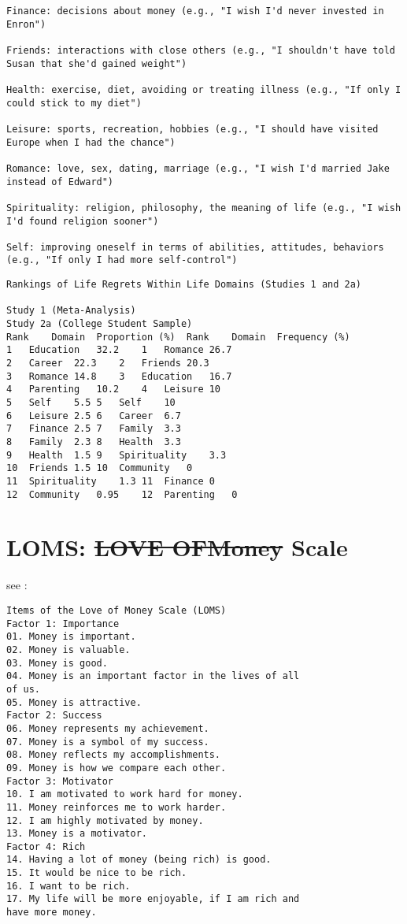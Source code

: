 \documentclass[10pt, letterpaper]{article}
\providecommand{\DIFaddtex}[1]{{\protect\color{blue}\uwave{#1}}} %
\providecommand{\DIFdeltex}[1]{{\protect\color{red}\sout{#1}}}                      %
\providecommand{\DIFaddbegin}{} %
\providecommand{\DIFaddend}{} %
\providecommand{\DIFdelbegin}{} %
\providecommand{\DIFdelend}{} %
\providecommand{\DIFadd}[1]{\texorpdfstring{\DIFaddtex{#1}}{#1}} %
\providecommand{\DIFdel}[1]{\texorpdfstring{\DIFdeltex{#1}}{}} %
\newcommand{\DIFscaledelfig}{0.5}
\newlength{\DIFdelgraphicswidth} %
\newlength{\DIFdelgraphicsheight} %
\newcommand{\DIFaddincludegraphics}[2][]{{\color{blue}\fbox{\DIFOincludegraphics[#1]{#2}}}} %
\newcommand{\DIFdelincludegraphics}[2][]{%
\sbox{\DIFdelgraphicsbox}{\DIFOincludegraphics[#1]{#2}}%
\settoboxwidth{\DIFdelgraphicswidth}{\DIFdelgraphicsbox} %
\settoboxtotalheight{\DIFdelgraphicsheight}{\DIFdelgraphicsbox} %
\scalebox{\DIFscaledelfig}{%
\parbox[b]{\DIFdelgraphicswidth}{\usebox{\DIFdelgraphicsbox}\\[-\baselineskip] \rule{\DIFdelgraphicswidth}{0em}}\llap{\resizebox{\DIFdelgraphicswidth}{\DIFdelgraphicsheight}{%
\setlength{\unitlength}{\DIFdelgraphicswidth}%
\begin{picture}(1,1)%
\thicklines\linethickness{2pt} %
{\color[rgb]{1,0,0}\put(0,0){\framebox(1,1){}}}%
{\color[rgb]{1,0,0}\put(0,0){\line( 1,1){1}}}%
{\color[rgb]{1,0,0}\put(0,1){\line(1,-1){1}}}%
\end{picture}%
}\hspace*{3pt}}} %
} %
\DeclareRobustCommand{\DIFaddbegin}{\DIFOaddbegin \let\includegraphics\DIFaddincludegraphics} %
\DeclareRobustCommand{\DIFaddend}{\DIFOaddend \let\includegraphics\DIFOincludegraphics} %
\DeclareRobustCommand{\DIFdelbegin}{\DIFOdelbegin \let\includegraphics\DIFdelincludegraphics} %
\DeclareRobustCommand{\DIFdelend}{\DIFOaddend \let\includegraphics\DIFOincludegraphics} %
\begin{document}
\begin{spacing}{1.8}
\begin{verbatim}
Finance: decisions about money (e.g., "I wish I'd never invested in Enron")

Friends: interactions with close others (e.g., "I shouldn't have told Susan that she'd gained weight")

Health: exercise, diet, avoiding or treating illness (e.g., "If only I could stick to my diet")

Leisure: sports, recreation, hobbies (e.g., "I should have visited Europe when I had the chance")

Romance: love, sex, dating, marriage (e.g., "I wish I'd married Jake instead of Edward")

Spirituality: religion, philosophy, the meaning of life (e.g., "I wish I'd found religion sooner")

Self: improving oneself in terms of abilities, attitudes, behaviors (e.g., "If only I had more self-control")
\end{verbatim}


\begin{verbatim}
Rankings of Life Regrets Within Life Domains (Studies 1 and 2a)

Study 1 (Meta-Analysis)
Study 2a (College Student Sample)
Rank	Domain	Proportion (%)	Rank	Domain	Frequency (%)
1	Education	32.2	1	Romance	26.7
2	Career	22.3	2	Friends	20.3
3	Romance	14.8	3	Education	16.7
4	Parenting	10.2	4	Leisure	10
5	Self	5.5	5	Self	10
6	Leisure	2.5	6	Career	6.7
7	Finance	2.5	7	Family	3.3
8	Family	2.3	8	Health	3.3
9	Health	1.5	9	Spirituality	3.3
10	Friends	1.5	10	Community	0
11	Spirituality	1.3	11	Finance	0
12	Community	0.95	12	Parenting	0
\end{verbatim}

\section{LOMS: \DIFdelbegin \DIFdel{LOVE OFMoney }\DIFdelend \DIFaddbegin \DIFadd{Love OfMoney }\DIFaddend Scale}

see \citet{tang2003income}:

\begin{verbatim}
Items of the Love of Money Scale (LOMS)
Factor 1: Importance
01. Money is important.
02. Money is valuable.
03. Money is good.
04. Money is an important factor in the lives of all
of us.
05. Money is attractive.
Factor 2: Success
06. Money represents my achievement.
07. Money is a symbol of my success.
08. Money reflects my accomplishments.
09. Money is how we compare each other.
Factor 3: Motivator
10. I am motivated to work hard for money.
11. Money reinforces me to work harder.
12. I am highly motivated by money.
13. Money is a motivator.
Factor 4: Rich
14. Having a lot of money (being rich) is good.
15. It would be nice to be rich.
16. I want to be rich.
17. My life will be more enjoyable, if I am rich and
have more money.
\end{verbatim}


\end{spacing}
\end{document}
